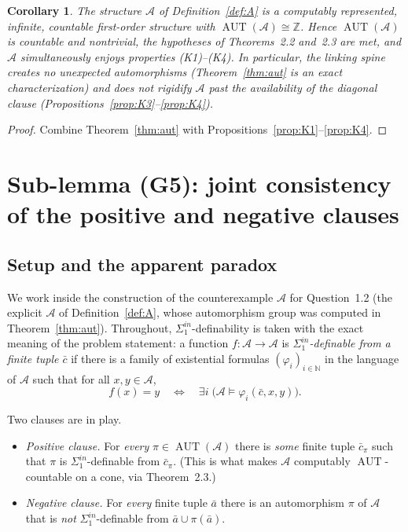 \documentclass[12pt,fullpage]{article}
\newtheorem{corollary}[theorem]{Corollary}
\theoremstyle{definition}
\newcommand{\A}{\mathcal{A}}
\newcommand{\N}{\mathbb{N}}
\newcommand{\Z}{{\mathbb{Z}}}
\newcommand{\AUT}{\operatorname{AUT}}
\renewcommand{\phi}{\varphi}
\begin{document}
\begin{corollary}\label{cor:G2}
The structure $\A$ of Definition~\ref{def:A} is a computably represented,
infinite, countable first-order structure with $\AUT(\A)\cong\Z$.  Hence
$\AUT(\A)$ is countable and nontrivial, the hypotheses of Theorems~2.2
and~2.3 are met, and $\A$ simultaneously enjoys properties
(K1)--(K4).  In particular, the linking spine creates no unexpected
automorphisms (Theorem~\ref{thm:aut} is an exact characterization) and does
not rigidify $\A$ past the availability of the diagonal clause
(Propositions~\ref{prop:K3}--\ref{prop:K4}).
\end{corollary}

\begin{proof}
Combine Theorem~\ref{thm:aut} with
Propositions~\ref{prop:K1}--\ref{prop:K4}.
\end{proof}

\section*{Sub-lemma (G5): joint consistency of the positive and negative clauses}

\subsection*{Setup and the apparent paradox}

We work inside the construction of the counterexample $\A$ for
Question~1.2 (the explicit $\A$ of Definition~\ref{def:A}, whose automorphism
group was computed in Theorem~\ref{thm:aut}).  Throughout,
$\Sigma^{in}_1$-definability is taken with the
exact meaning of the problem statement: a function $f\colon\A\to\A$ is
\emph{$\Sigma^{in}_1$-definable from a finite tuple $\bar c$} if there is a
family of existential formulas $(\phi_i)_{i\in\N}$ in the language of $\A$
such that for all $x,y\in\A$,
\[
f(x)=y\quad\Longleftrightarrow\quad \exists i\;\bigl(\A\models\phi_i(\bar c,x,y)\bigr).
\tag{$\ast$}
\]

Two clauses are in play.

\begin{itemize}
\item[(P1)] \emph{Positive clause.} For \emph{every} $\pi\in\AUT(\A)$ there
  is \emph{some} finite tuple $\bar c_\pi$ such that $\pi$ is
  $\Sigma^{in}_1$-definable from $\bar c_\pi$.  (This is what makes $\A$
  computably $\AUT$-countable on a cone, via Theorem~2.3.)
\item[(P2)] \emph{Negative clause.} For \emph{every} finite tuple $\bar a$
  there is an automorphism $\pi$ of $\A$ that is \emph{not}
  $\Sigma^{in}_1$-definable from $\bar a\cup\pi(\bar a)$.
\end{itemize}
\end{document}
